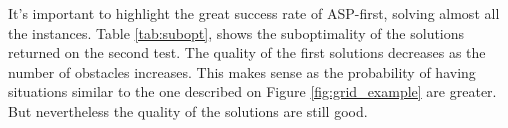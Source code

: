 It's important to highlight the great success rate of ASP-first, solving almost all the instances. Table \ref{tab:subopt}, shows the suboptimality of the solutions returned on the second test. The quality of the first solutions decreases as the number of obstacles increases. This makes sense as the probability of having situations similar to the one described on Figure \ref{fig:grid_example} are greater. But nevertheless the quality of the solutions are still good.



